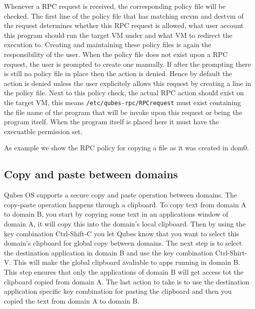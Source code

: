 \documentclass[runningheads,a4paper]{article}
\begin{document}
Whenever a RPC request is received, the corresponding policy file will
be checked. The first line of the policy file that has matching srcvm
and destvm of the request determines whether this RPC request is
allowed, what user account this program should run the target VM under
and what VM to redirect the execution to. Creating and maintaining
these policy files is again the responsibility of the user. When the
policy file does not exist upon a RPC request, the user is prompted to
create one manually. If after the prompting there is still no policy
file in place then the action is denied. Hence by default the action
is denied unless the user explicitely allows this request by creating
a line in the policy file. Next to this policy check,
the actual RPC action should exist on the target VM, this means
\texttt{/etc/qubes-rpc/RPCrequest} must exist containing the file name
of the program that will be invoke upon this request or being the
program itself. When the program itself is placed here it must have
the execuatble permission set. 

As example we show the RPC policy for copying a file as it was created
in dom0.

\subsection{Copy and paste between domains} 

Qubes OS supports a secure
copy and paste operation between domains.  The copy-paste operation
happens through a clipboard.  To copy text from domain A to domain B,
you start by copying some text in an applications window of domain A,
it will copy this into the domain's local clipboard.  Then by using
the key combination Ctrl-Shift-C you let Qubes know that you want to
select this domain's clipboard for global copy between domains.  The
next step is to select the destination application in domain B and use
the key combination Ctrl-Shirt-V.  This will make the global clipboard
avaliable to apps running in domain B.  This step ensures that only
the applications of domain B will get access tot the clipboard copied
from domain A.  The last action to take is to use the destination
application specific key combination for pasting the clipboard and
then you copied the text from domain A to domain B.
\end{document}
